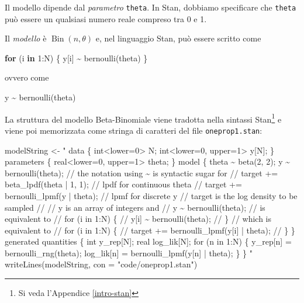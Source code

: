 \documentclass[
  11pt,
  italian,
  a4paper,
  extrafontsizes,onecolumn,openright
  ]{memoir}
\newenvironment{Shaded}{\begin{snugshade}}{\end{snugshade}}
\newcommand{\AttributeTok}[1]{\textcolor[rgb]{0.77,0.63,0.00}{#1}}
\newcommand{\ControlFlowTok}[1]{\textcolor[rgb]{0.13,0.29,0.53}{\textbf{#1}}}
\newcommand{\DecValTok}[1]{\textcolor[rgb]{0.00,0.00,0.81}{#1}}
\newcommand{\FunctionTok}[1]{\textcolor[rgb]{0.00,0.00,0.00}{#1}}
\newcommand{\NormalTok}[1]{#1}
\newcommand{\OtherTok}[1]{\textcolor[rgb]{0.56,0.35,0.01}{#1}}
\newcommand{\SpecialCharTok}[1]{\textcolor[rgb]{0.00,0.00,0.00}{#1}}
\newcommand{\StringTok}[1]{\textcolor[rgb]{0.31,0.60,0.02}{#1}}
\DeclareMathOperator{\Bin}{Bin} %
\begin{document}
Il modello dipende dal \emph{parametro} \texttt{theta}. In Stan, dobbiamo specificare che \texttt{theta} può essere un qualsiasi numero reale compreso tra 0 e 1.

Il \emph{modello} è \(\Bin(n, \theta)\) e, nel linguaggio Stan, può essere scritto come

\begin{Shaded}
\begin{Highlighting}[]
\ControlFlowTok{for}\NormalTok{ (i }\ControlFlowTok{in} \DecValTok{1}\SpecialCharTok{:}\NormalTok{N) \{}
\NormalTok{  y[i] }\SpecialCharTok{\textasciitilde{}} \FunctionTok{bernoulli}\NormalTok{(theta)}
\NormalTok{\}}
\end{Highlighting}
\end{Shaded}

\noindent
ovvero come

\begin{Shaded}
\begin{Highlighting}[]
\NormalTok{y }\SpecialCharTok{\textasciitilde{}} \FunctionTok{bernoulli}\NormalTok{(theta)}
\end{Highlighting}
\end{Shaded}

La struttura del modello Beta-Binomiale viene tradotta nella sintassi Stan\footnote{Si veda l'Appendice \ref{intro-stan}} e viene poi memorizzata come stringa di caratteri del file \texttt{oneprop1.stan}:

\begin{Shaded}
\begin{Highlighting}[]
\NormalTok{modelString }\OtherTok{\textless{}{-}} \StringTok{"}
\StringTok{data \{}
\StringTok{  int\textless{}lower=0\textgreater{} N;}
\StringTok{  int\textless{}lower=0, upper=1\textgreater{} y[N];}
\StringTok{\}}
\StringTok{parameters \{}
\StringTok{  real\textless{}lower=0, upper=1\textgreater{} theta;}
\StringTok{\}}
\StringTok{model \{}
\StringTok{  theta \textasciitilde{} beta(2, 2);}
\StringTok{  y \textasciitilde{} bernoulli(theta);}
\StringTok{  // the notation using \textasciitilde{} is syntactic sugar for}
\StringTok{  //  target += beta\_lpdf(theta | 1, 1);   // lpdf for continuous theta}
\StringTok{  //  target += bernoulli\_lpmf(y | theta); // lpmf for discrete y}
\StringTok{  // target is the log density to be sampled}
\StringTok{  //}
\StringTok{  // y is an array of integers and}
\StringTok{  //  y \textasciitilde{} bernoulli(theta);}
\StringTok{  // is equivalent to}
\StringTok{  //  for (i in 1:N) \{}
\StringTok{  //    y[i] \textasciitilde{} bernoulli(theta);}
\StringTok{  //  \}}
\StringTok{  // which is equivalent to}
\StringTok{  //  for (i in 1:N) \{}
\StringTok{  //    target += bernoulli\_lpmf(y[i] | theta);}
\StringTok{  //  \}}
\StringTok{\}}
\StringTok{generated quantities \{}
\StringTok{  int y\_rep[N];}
\StringTok{  real log\_lik[N];}
\StringTok{  for (n in 1:N) \{}
\StringTok{    y\_rep[n] = bernoulli\_rng(theta);}
\StringTok{    log\_lik[n] = bernoulli\_lpmf(y[n] | theta);}
\StringTok{  \}}
\StringTok{\}}
\StringTok{"}
\FunctionTok{writeLines}\NormalTok{(modelString, }\AttributeTok{con =} \StringTok{"code/oneprop1.stan"}\NormalTok{)}
\end{Highlighting}
\end{Shaded}
\end{document}
